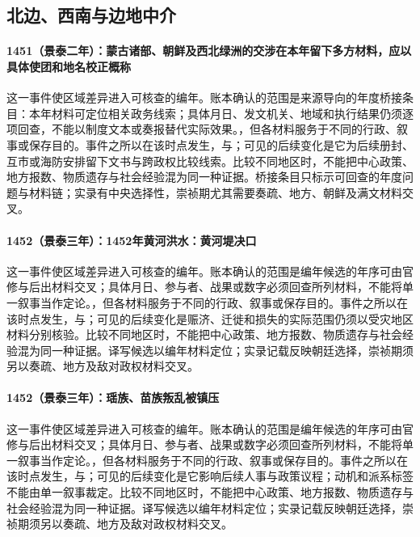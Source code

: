 \subsection{北边、西南与边地中介}

\paragraph{1451（景泰二年）：蒙古诸部、朝鲜及西北绿洲的交涉在本年留下多方材料，应以具体使团和地名校正概称} 这一事件使区域差异进入可核查的编年。账本确认的范围是来源导向的年度桥接条目：本年材料可定位相关政务线索；具体月日、发文机关、地域和执行结果仍须逐项回查，不能以制度文本或奏报替代实际效果。，但各材料服务于不同的行政、叙事或保存目的。事件之所以在该时点发生，与；可见的后续变化是它为后续册封、互市或海防安排留下文书与跨政权比较线索。比较不同地区时，不能把中心政策、地方报数、物质遗存与社会经验混为同一种证据。桥接条目只标示可回查的年度问题与材料链；实录有中央选择性，崇祯期尤其需要奏疏、地方、朝鲜及满文材料交叉。

\paragraph{1452（景泰三年）：1452年黄河洪水：黄河堤决口} 这一事件使区域差异进入可核查的编年。账本确认的范围是编年候选的年序可由官修与后出材料交叉；具体月日、参与者、战果或数字必须回查所列材料，不能将单一叙事当作定论。，但各材料服务于不同的行政、叙事或保存目的。事件之所以在该时点发生，与；可见的后续变化是赈济、迁徙和损失的实际范围仍须以受灾地区材料分别核验。比较不同地区时，不能把中心政策、地方报数、物质遗存与社会经验混为同一种证据。译写候选以编年材料定位；实录记载反映朝廷选择，崇祯期须另以奏疏、地方及敌对政权材料交叉。

\paragraph{1452（景泰三年）：瑶族、苗族叛乱被镇压} 这一事件使区域差异进入可核查的编年。账本确认的范围是编年候选的年序可由官修与后出材料交叉；具体月日、参与者、战果或数字必须回查所列材料，不能将单一叙事当作定论。，但各材料服务于不同的行政、叙事或保存目的。事件之所以在该时点发生，与；可见的后续变化是它影响后续人事与政策议程；动机和派系标签不能由单一叙事裁定。比较不同地区时，不能把中心政策、地方报数、物质遗存与社会经验混为同一种证据。译写候选以编年材料定位；实录记载反映朝廷选择，崇祯期须另以奏疏、地方及敌对政权材料交叉。

